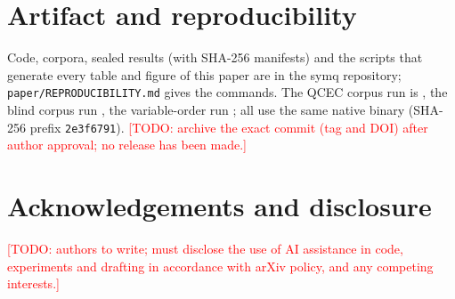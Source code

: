 \documentclass[10pt,a4paper]{article}
\theoremstyle{definition}
\newcommand{\symq}{\textsf{symq}}
\newcommand{\todo}[1]{\textcolor{red}{[TODO: #1]}}
\begin{document}
\section*{Artifact and reproducibility}
Code, corpora, sealed results (with SHA-256 manifests) and the scripts that generate every
table and figure of this paper are in the \symq{} repository; \texttt{paper/REPRODUCIBILITY.md}
gives the commands. The QCEC corpus run is \texttt{\QCommit}, the blind corpus run
\BlindCommitText, the variable-order run \texttt{\QOrderCommit}; all use the same native
binary (SHA-256 prefix \texttt{2e3f6791}). \todo{archive the exact commit (tag and DOI) after author approval; no
release has been made.}

\section*{Acknowledgements and disclosure}
\todo{authors to write; must disclose the use of AI assistance in code, experiments and
drafting in accordance with arXiv policy, and any competing interests.}



\end{document}
